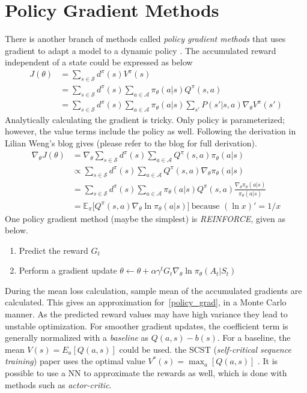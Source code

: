 \documentclass{book}
\numberwithin{equation}{subsection}
\begin{document}
\section{Policy Gradient Methods}
There is another branch of methods called \textit{policy gradient methods} that uses gradient to adapt a model to a dynamic policy \cite{lapan_deep_2020}. The accumulated reward independent of a state could be expressed as below
\begin{align}
    J(\theta)
&= \sum_{s \in \mathcal{S}} d^\pi(s) V^\pi(s) \\
&= \sum_{s \in \mathcal{S}} d^\pi(s) \sum_{a \in \mathcal{A}} \pi_\theta(a \vert s) Q^\pi(s, a)\\
&= \sum_{s \in \mathcal{S}} d^\pi(s)\sum_{a \in \mathcal{A}} \pi_\theta(a \vert s) \sum_{s'} P(s' \vert s,a) \nabla_\theta V^\pi(s')
\end{align}
Analytically calculating the gradient is tricky. Only policy is parameterized; however, the value terms include the policy as well. Following the derivation in Lilian Weng's blog gives (please refer to the blog for full derivation).
\begin{align}
\nabla_\theta J(\theta)
&= \nabla_\theta \sum_{s \in \mathcal{S}} d^\pi(s) \sum_{a \in \mathcal{A}} Q^\pi(s, a) \pi_\theta(a \vert s) \\
&\propto \sum_{s \in \mathcal{S}} d^\pi(s) \sum_{a \in \mathcal{A}} Q^\pi(s, a) \nabla_\theta \pi_\theta(a \vert s) \\
&= \sum_{s \in \mathcal{S}} d^\pi(s) \sum_{a \in \mathcal{A}} \pi_\theta(a \vert s) Q^\pi(s, a) \frac{\nabla_\theta \pi_\theta(a \vert s)}{\pi_\theta(a \vert s)} \\
&= \mathbb{E}_\pi \big[Q^\pi(s, a) \nabla_\theta \ln \pi_\theta(a \vert s)\big]\ \scriptstyle{\text{because } (\ln x)' = 1/x} \label{policy_grad}
\end{align}
One policy gradient method (maybe the simplest) is \textit{REINFORCE}, given as below.
\begin{enumerate}
    \item Predict the reward $G_t$
    \item Perform a gradient update $\theta \leftarrow \theta + \alpha \gamma^t G_t \nabla_\theta \ln \pi_\theta(A_t \vert S_t)$\ \cite{weng_policy_2018}
\end{enumerate}
During the mean loss calculation, sample mean of the accumulated gradients are calculated. This gives an approximation for~\ref{policy_grad}, in a Monte Carlo manner. As the predicted reward values may have high variance they lead to unstable optimization. For smoother gradient updates, the coefficient term is generally normalized with a \textit{baseline} as $Q(a,s)-b(s)$. For a baseline, the mean $V(s) = E_a[Q(a,s)]$ could be used. the SCST (\textit{self-critical sequence training}) paper uses the optimal value $V^*(s) = \max_a[Q(a,s)]$ \cite{rennie_self-critical_2017}. It is possible to use a NN to approximate the rewards as well, which is done with methods such as \textit{actor-critic}.
\end{document}
